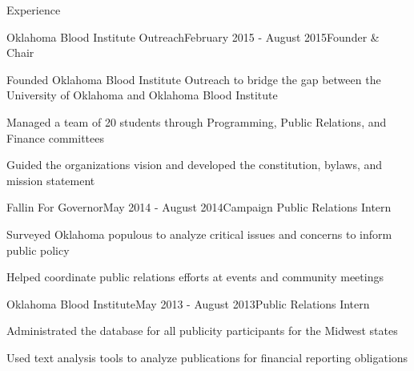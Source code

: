 \documentclass{resume} %
\begin{document}
\begin{rSection}{Experience}

\begin{rSubsection}{Oklahoma Blood Institute Outreach}{February 2015 - August 2015}{Founder \& Chair}{}
\item Founded Oklahoma Blood Institute Outreach to bridge the gap between the University of Oklahoma and Oklahoma Blood Institute 
\item Managed a team of 20 students through Programming, Public Relations, and Finance committees
\item Guided the organizations vision and developed the constitution, bylaws, and mission statement  
\end{rSubsection}

\begin{rSubsection}{Fallin For Governor}{May 2014 - August 2014}{Campaign Public Relations Intern}{}
\item Surveyed Oklahoma populous to analyze critical issues and concerns to inform public policy
\item Helped coordinate public relations efforts at events and community meetings
\end{rSubsection}
\begin{rSubsection}{Oklahoma Blood Institute}{May 2013 - August 2013}{Public Relations Intern}{}
\item Administrated the database for all publicity participants for the Midwest states 
\item Used text analysis tools to analyze publications for financial reporting obligations 

\end{rSubsection}

\end{rSection}
\end{document}
